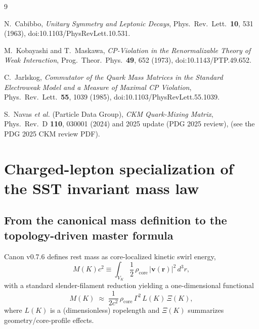 \documentclass[10pt]{article}
\begin{document}
        \begin{thebibliography}{9}

            N.~Cabibbo,
            \textit{Unitary Symmetry and Leptonic Decays},
            Phys.\ Rev.\ Lett.\ \textbf{10}, 531 (1963),
            doi:10.1103/PhysRevLett.10.531.

            M.~Kobayashi and T.~Maskawa,
            \textit{CP-Violation in the Renormalizable Theory of Weak Interaction},
            Prog.\ Theor.\ Phys.\ \textbf{49}, 652 (1973),
            doi:10.1143/PTP.49.652.

            C.~Jarlskog,
            \textit{Commutator of the Quark Mass Matrices in the Standard Electroweak Model and a Measure of Maximal CP Violation},
            Phys.\ Rev.\ Lett.\ \textbf{55}, 1039 (1985),
            doi:10.1103/PhysRevLett.55.1039.

            S.~Navas \textit{et al.} (Particle Data Group),
            \textit{CKM Quark-Mixing Matrix},
            Phys.\ Rev.\ D \textbf{110}, 030001 (2024) and 2025 update (PDG 2025 review),
            (see the PDG 2025 CKM review PDF).

        \end{thebibliography}


        \appendix
    \section{Charged-lepton specialization of the SST invariant mass law}
    \label{app:leptons_master_mass}

    \newcommand{\rhoF}{\rho_{\!f}}
    \newcommand{\rhoE}{\rho_{\!E}}
    \newcommand{\rhoM}{\rho_{\!m}}
    \newcommand{\rc}{r_c}

    \subsection{From the canonical mass definition to the topology-driven master formula}

        Canon v0.7.6 defines rest mass as core-localized kinetic swirl energy,
        \begin{equation}
            M(K)c^2 \equiv \int_{V_K}\frac12\,\rho_{\text{core}}\,|\mathbf v(\mathbf r)|^2\,d^3r,
            \label{eq:mass_core_integral}
        \end{equation}
        with a standard slender-filament reduction yielding a one-dimensional functional
        \begin{equation}
            M(K)\;\approx\;\frac{1}{2c^2}\,\rho_{\text{core}}\,\Gamma^2\,L(K)\,\Xi(K),
            \label{eq:mass_slender_reduction}
        \end{equation}
        where $L(K)$ is a (dimensionless) ropelength and $\Xi(K)$ summarizes geometry/core-profile effects.
\end{document}
